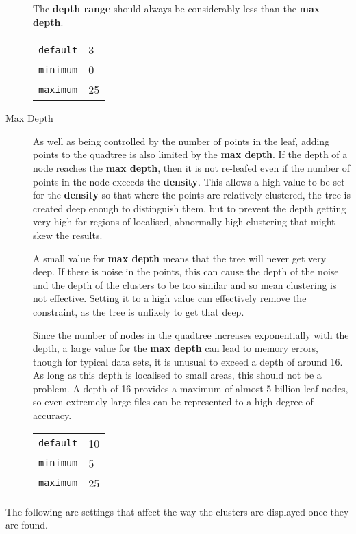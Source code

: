 \begin{description}
		The \textbf{depth range} should always be considerably less than the
		\textbf{max depth}.

		\begin{tabular}{r l}
			\texttt{default} & 3 \\
			\texttt{minimum} & 0 \\
			\texttt{maximum} & 25 \\
		\end{tabular}

	\item[Max Depth] As well as being controlled by the number of points in the
		leaf, adding points to the quadtree is also limited by the \textbf{max
		depth}. If the depth of a node reaches the \textbf{max depth}, then it
		is not re-leafed even if the number of points in the node exceeds the
		\textbf{density}.  This allows a high value to be set for the
		\textbf{density} so that where the points are relatively clustered, the
		tree is created deep enough to distinguish them, but to prevent the
		depth getting very high for regions of localised, abnormally high
		clustering that might skew the results.

		A small value for \textbf{max depth} means that the tree will never get
		very deep. If there is noise in the points, this can cause the depth of
		the noise and the depth of the clusters to be too similar and so mean
		clustering is not effective. Setting it to a high value can effectively
		remove the constraint, as the tree is unlikely to get that deep.

		Since the number of nodes in the quadtree increases exponentially with
		the depth, a large value for the \textbf{max depth} can lead to memory
		errors, though for typical data sets, it is unusual to exceed a depth
		of around 16. As long as this depth is localised to small areas, this
		should not be a problem. A depth of 16 provides a maximum of
		almost 5 billion leaf nodes, so even extremely large files can be
		represented to a high degree of accuracy.

		\begin{tabular}{r l}
			\texttt{default} & 10 \\
			\texttt{minimum} & 5 \\
			\texttt{maximum} & 25 \\
		\end{tabular}

\end{description}

The following are settings that affect the way the clusters are displayed once
they are found.

